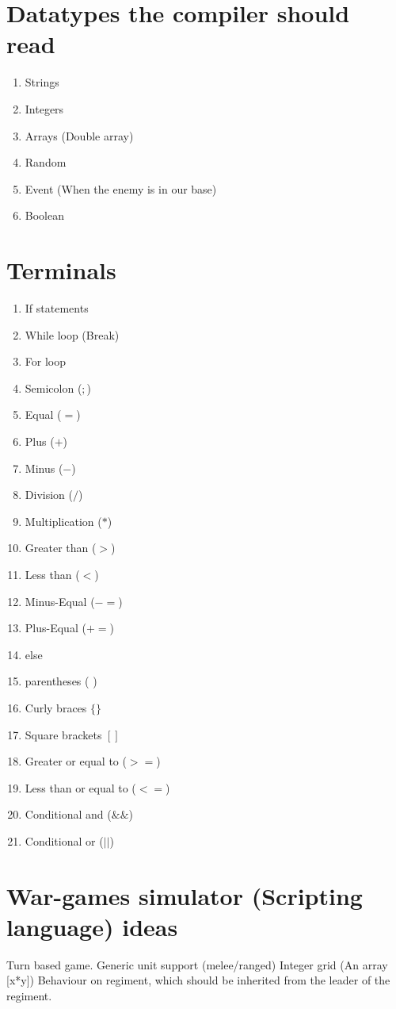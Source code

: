 


\section*{Datatypes the compiler should read}

\begin{enumerate}
	\item Strings
	\item Integers
	\item Arrays (Double array)
	\item Random
	\item Event (When the enemy is in our base)
	\item Boolean
\end{enumerate}


\section*{Terminals}
\begin{enumerate}

	\item If statements
	\item While loop (Break)
	\item For loop	
	\item Semicolon ($;$)
	\item Equal ($=$)
	\item Plus ($+$)
	\item Minus ($-$)
	\item Division ($/$)
	\item Multiplication ($*$)
	\item Greater than ($>$)
	\item Less than ($<$)
	\item Minus-Equal ($-=$)
	\item Plus-Equal ($+=$)
	\item else 
	\item parentheses ( )
	\item Curly braces $\{ \}$
	\item Square brackets $[ ]$
	\item Greater or equal to ($>=$)
	\item Less than or equal to ($<=$)
	\item Conditional and ($\&\&$)
	\item Conditional or ($||$)
	
\end{enumerate}

\section*{War-games simulator (Scripting language) ideas}

Turn based game.
Generic unit support (melee/ranged)
Integer grid (An array [x*y])
Behaviour on regiment, which should be inherited from the leader of the regiment.

